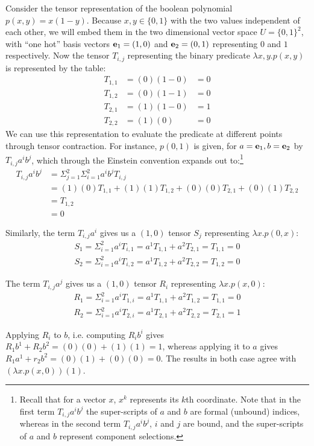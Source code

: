 \begin{example}\label{ex:tc-1}
  Consider the tensor representation of the boolean polynomial \(p(x,y) = x(1-y)\). Because \(x,y\in \{0,1\}\) with the two values independent of each other, we will embed them in the two dimensional vector space \(U=\{0,1\}^2\), with ``one hot'' basis vectors \({\bf e}_1=(1,0)\) and \({\bf e}_2=(0,1)\) representing \(0\) and \(1\) respectively. Now the tensor \(T_{i,j}\) representing the binary predicate \(\lambda x,y. p(x,y)\) is represented by the table:
  \[
  \begin{array}{lll}
    {T_{1,1}}&=(0)(1-0)&=0\\
    {T_{1,2}}&=(0)(1-1)&=0\\
    {T_{2,1}}&=(1)(1-0)&=1\\
    {T_{2,2}}&=(1)(0)&=0
  \end{array}
  \]
  We can use this representation to evaluate the predicate at different points through tensor contraction. For instance, \(p(0,1)\) is given, for \(a={\bf e}_1,b={\bf e}_2\) by \(T_{i,j}a^i b^j\), which through the Einstein convention expands out to:\footnote{Recall that for a vector \(x\), \(x^k\) represents its \(k\)th coordinate. Note that
    in the first  term \(T_{i,j}a^ib^j\) the super-scripts of \(a\) and \(b\) are formal (unbound) indices, whereas in  the second term \(T_{i,j}a^i b^j \), \(i\) and \(j\) are bound, and the super-scripts of \(a\) and \(b\) represent component selections.}
  \[\begin{array}{ll}
  T_{i,j}a^i b^j &= \Sigma_{j=1}^2 \Sigma_{i=1}^2 a^i b^j T_{i,j}\\
  &= (1)(0) T_{1,1} + (1)(1) T_{1,2}
      + (0)(0) T_{2,1} + (0)(1) T_{2,2}\\
  & =T_{1,2}\\
  & = 0
  \end{array}
  \]

  Similarly, the term \(T_{i,j} a^i\) gives us a \((1,0)\) tensor \(S_j\) representing \(\lambda x.p(0,x)\):
  \[
  \begin{array}{l}
    S_1 = \Sigma_{i=1}^2 a^i T_{i,1} =a^1 T_{1,1} + a^2  T_{2,1} = T_{1,1} = 0\\
    S_2 = \Sigma_{i=1}^2 a^i T_{i,2} =a^1 T_{1,2} + a^2  T_{2,2} =  T_{1,2} = 0    
  \end{array}\]

  The term \(T_{i,j} a^j\) gives us a \((1,0)\) tensor \(R_i\) representing \(\lambda x. p(x,0)\):
  \[\begin{array}{l}
    R_1 = \Sigma_{i=1}^2 a^i T_{1,i} =a^1 T_{1,1} + a^2  T_{1,2} = T_{1,1} = 0\\
    R_2 = \Sigma_{i=1}^2 a^i T_{2,i} =a^1 T_{2,1} + a^2  T_{2,2} =  T_{2,1} = 1    
  \end{array}\]

    Applying \(R_i\) to \(b\), i.e. computing \(R_ib^i\) gives \(R_1 b^1 + R_2 b^2=(0)(0) + (1)(1)=1\), whereas applying it to \(a\)  gives  \(R_1 a^1 + r_2 b^2 = (0)(1)+(0)(0) = 0\). The results in both case agree with \((\lambda x.p(x,0))(1)\).
  
\end{example}

